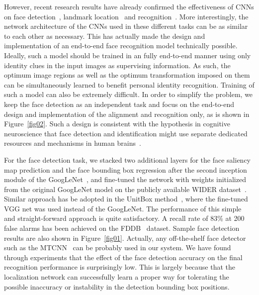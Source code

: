 \documentclass[10pt,twocolumn,letterpaper]{article}
\begin{document}
However, recent research results have already confirmed the effectiveness of CNNs on face detection~\cite{zhang2016joint}, landmark location~\cite{Zhou2013Extensive} and recognition~\cite{sun2014deep,taigman2014deepface}.
More interestingly, the network architecture of the CNNs used in these different tasks can be as  similar to each other as necessary.
This has actually made the design and implementation of an end-to-end face recognition model technically possible.
Ideally, such a model should be trained in an fully end-to-end manner using only identity clues in the input images as supervising information.
As such, the optimum image regions as well as the optimum transformation imposed on them can be simultaneously learned to benefit personal identity recognition. 
Training of such a model can also be extremely difficult.
In order to simplify the problem, we keep the face detection as an independent task and focus on the end-to-end design and implementation of the alignment and recognition only, as is shown in Figure~\ref{fig02}. 
Such a design is consistent with the hypothesis in cognitive neuroscience that face detection and identification might use separate dedicated resources and mechanisms in human brains~\cite{Tsao2008Mechanisms}.


For the face detection task, we stacked two additional layers for the face saliency map prediction and the face bounding box regression after the second inception module of the GoogLeNet~\cite{Szegedy2015Going}, and fine-tuned the network with weights initialized from the original GoogLeNet model on the publicly available WIDER dataset~\cite{yang2016wider}. 
Similar approach has be adopted in the UnitBox method~\cite{Yu2016UnitBox}, where the fine-tuned VGG net was used instead of the GoogLeNet. 
The performance of this simple and straight-forward approach is quite satisfactory. 
A recall rate of 83\% at 200 false alarms has been achieved on the FDDB~\cite{fddbTech} dataset.
Sample face detection results are also shown in Figure~\ref{fig01}.
Actually, any off-the-shelf face detector such as the MTCNN~\cite{zhang2016joint} can be probably used in our system. 
We have found through experiments that the effect of the face detection accuracy on the final recognition performance is surprisingly low. 
This is largely because that the localization network can successfully learn a proper way for tolerating the possible inaccuracy or instability in the detection bounding box positions.
\end{document}
